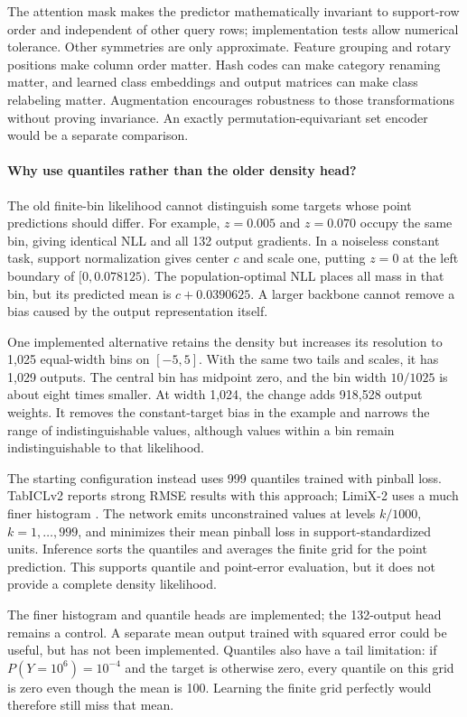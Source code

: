 \documentclass[11pt]{article}
\begin{document}
The attention mask makes the predictor mathematically invariant to support-row order and independent of other query rows; implementation tests allow numerical tolerance. Other symmetries are only approximate. Feature grouping and rotary positions make column order matter. Hash codes can make category renaming matter, and learned class embeddings and output matrices can make class relabeling matter. Augmentation encourages robustness to those transformations without proving invariance. An exactly permutation-equivariant set encoder would be a separate comparison.

\paragraph{Why use quantiles rather than the older density head?}
The old finite-bin likelihood cannot distinguish some targets whose point predictions should differ. For example, $z=0.005$ and $z=0.070$ occupy the same bin, giving identical NLL and all 132 output gradients. In a noiseless constant task, support normalization gives center $c$ and scale one, putting $z=0$ at the left boundary of $[0,0.078125)$. The population-optimal NLL places all mass in that bin, but its predicted mean is $c+0.0390625$. A larger backbone cannot remove a bias caused by the output representation itself.

One implemented alternative retains the density but increases its resolution to 1,025 equal-width bins on $[-5,5]$. With the same two tails and scales, it has 1,029 outputs. The central bin has midpoint zero, and the bin width $10/1025$ is about eight times smaller. At width 1,024, the change adds 918,528 output weights. It removes the constant-target bias in the example and narrows the range of indistinguishable values, although values within a bin remain indistinguishable to that likelihood.

The starting configuration instead uses 999 quantiles trained with pinball loss. TabICLv2 reports strong RMSE results with this approach; LimiX-2 uses a much finer histogram \cite{tabicl2,limix2}. The network emits unconstrained values at levels $k/1000$, $k=1,\ldots,999$, and minimizes their mean pinball loss in support-standardized units. Inference sorts the quantiles and averages the finite grid for the point prediction. This supports quantile and point-error evaluation, but it does not provide a complete density likelihood.

The finer histogram and quantile heads are implemented; the 132-output head remains a control. A separate mean output trained with squared error could be useful, but has not been implemented. Quantiles also have a tail limitation: if $P(Y=10^6)=10^{-4}$ and the target is otherwise zero, every quantile on this grid is zero even though the mean is 100. Learning the finite grid perfectly would therefore still miss that mean.
\end{document}
